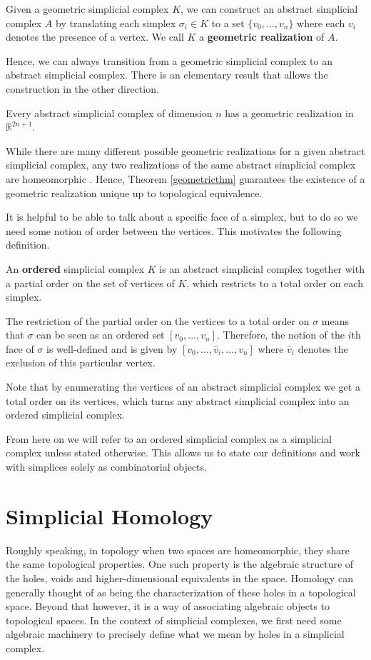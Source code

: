 \begin{definition}
Given a geometric simplicial complex $K$, we can construct an abstract simplicial complex $A$ by translating each simplex $\sigma_{i} \in K$ to a set $\{v_{0},\dots,v_{n}\}$ where each $v_{i}$  denotes the presence of a vertex. We call $K$ a \textbf{geometric realization} of $A$.
\end{definition}
Hence, we can always transition from a geometric simplicial complex to an abstract simplicial complex. There is an elementary result that allows the construction in the other direction.
\begin{theorem}\label{geometricthm}
Every abstract simplicial complex of dimension $n$ has a geometric realization in $\mathbb{R}^{2n+1}$.
\end{theorem}
While there are many different possible geometric realizations for a given abstract simplicial complex, any two realizations of the same abstract simplicial complex are homeomorphic \cite[Theorem 3.1, p. ~15]{munkres}. Hence, Theorem \ref{geometricthm} guarantees the existence of a geometric realization unique up to topological equivalence.

It is helpful to be able to talk about a specific face of a simplex, but to do so we need some notion of order between the vertices. This motivates the following definition.
\begin{definition} \label{defordsimcomp}
An \textbf{ordered} simplicial complex $K$ is an abstract simplicial complex together with a partial order on the set of vertices of $K$, which restricts to a total order on each simplex.
\end{definition}
The restriction of the partial order on the vertices to a total order on  $\sigma$ means that $\sigma$ can be seen as an ordered set $[v_{0},\dots,v_{n}]$. Therefore, the notion of the $i$th face of $\sigma$ is well-defined and is given by $[v_{0},\dots,\hat v_{i},\dots,v_{n}]$ where $\hat v_{i}$ denotes the exclusion of this particular vertex.

Note that by enumerating the vertices of an abstract simplicial complex we get a total order on its vertices, which turns any abstract simplicial complex into an ordered simplicial complex.

From here on we will refer to an ordered simplicial complex as a simplicial complex unless stated otherwise. This allows us to state our definitions and work with simplices solely as combinatorial objects.
\section{Simplicial Homology}
Roughly speaking, in topology when two spaces are homeomorphic, they share the same topological properties. One such property is the algebraic structure of the holes, voids and higher-dimensional equivalents in the space.
Homology can generally thought of as being the characterization of these holes in a topological space. Beyond that however, it is a way of associating algebraic objects to topological spaces. In the context of simplicial complexes, we first need some algebraic machinery to precisely define what we mean by holes in a simplicial complex.

